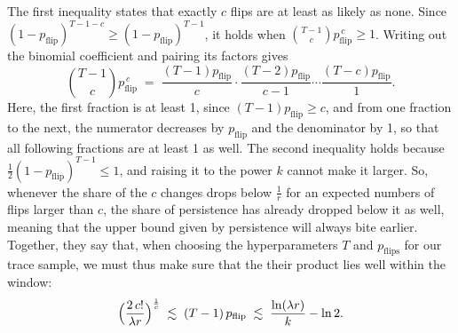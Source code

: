 \documentclass[titlepage,a4paper,11pt]{report}
\begin{document}
    The first inequality states that exactly $c$ flips are at least as likely as none. Since $(1-p_{\text{flip}})^{T-1-c}\ge(1-p_{\text{flip}})^{T-1}$, it holds when $\binom{T-1}{c}p_{\text{flip}}^{\,c}\ge1$. Writing out the binomial coefficient and pairing its factors gives
    \begin{equation*}
        \binom{T-1}{c}p_{\text{flip}}^{\,c}\;=\;\frac{(T-1)p_{\text{flip}}}{c}\cdot\frac{(T-2)p_{\text{flip}}}{c-1}\cdots\frac{(T-c)p_{\text{flip}}}{1}.
    \end{equation*}
    Here, the first fraction is at least 1, since $(T-1)p_{\text{flip}}\ge c$, and from one fraction to the next, the numerator decreases by $p_{\text{flip}}$ and the denominator by 1, so that all following fractions are at least 1 as well. The second inequality holds because $\frac12(1-p_{\text{flip}})^{T-1}\le1$, and raising it to the power $k$ cannot make it larger. So, whenever the share of the $c$ changes drops below $\frac1r$ for an expected numbers of flips larger than $c$, the share of persistence has already dropped below it as well, meaning that the upper bound given by persistence will always bite earlier. Together, they say that, when choosing the hyperparameters $T$ and $p_{\text{flips}}$ for our trace sample, we must thus make sure that the their product lies well within the window:
    \begin{equation}\label{eq:flip_window}
        \Bigl(\frac{2\,c!}{\lambda r}\Bigr)^\frac1c\;\lesssim\;(T-1)\,p_{\text{flip}}\;\lesssim\;\frac{\ln(\lambda r)}{k}-\ln 2 .
    \end{equation}
\end{document}
